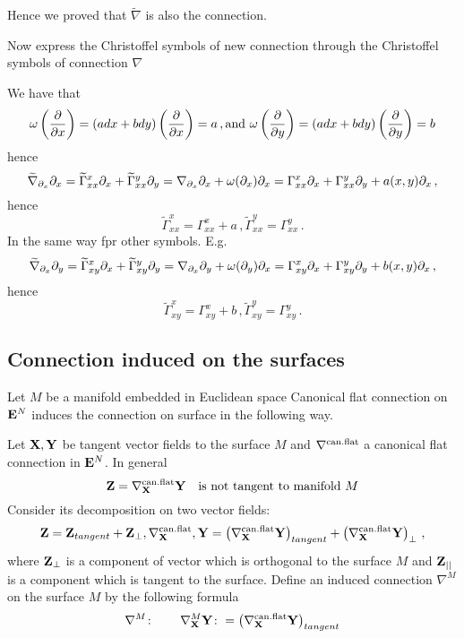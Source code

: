 \documentclass[12pt]{article}
\theoremstyle{theorem}
\numberwithin{equation}{section}
\begin{document}
		Hence we proved that
$\widetilde\nabla$ is also the connection.

Now express the Christoffel symbols of new connection
through the Christoffel symbols of connection $\nabla$

We have that
$$
\omega\left({\partial\over \partial x}\right)=
(adx+bdy)\left({\partial\over \partial x}\right)=a\,,
{\rm and}\,\,
\omega\left({\partial\over \partial y}\right)=
(adx+bdy)\left({\partial\over \partial y}\right)=b
$$
hence
            $$
\widetilde\nabla_{\partial_x}\partial_x=
\widetilde\Gamma^x_{xx}{\partial_x}
+\widetilde\Gamma^y_{xx}{\partial_y}=
\nabla_{\partial_x}\partial_x+\omega(\partial_x)\partial_x=
\Gamma^x_{xx}{\partial_x}
+\Gamma^y_{xx}{\partial_y}+a(x,y)\partial_x\,,
     $$
     hence
      $$
      \widetilde\Gamma^x_{xx}=
      \Gamma^x_{xx}+a\,,
      \widetilde\Gamma^y_{xx}=
      \Gamma^y_{xx}\,.
      $$
    In the same way fpr other symbols.  E.g. 
       $$
\widetilde\nabla_{\partial_x}\partial_y=
\widetilde\Gamma^x_{xy}{\partial_x}
+\widetilde\Gamma^y_{xy}{\partial_y}=
\nabla_{\partial_x}\partial_y+\omega(\partial_y)\partial_x=
\Gamma^x_{xy}{\partial_x}
+\Gamma^y_{xy}{\partial_y}+b(x,y)\partial_x\,,
     $$
     hence
      $$
      \widetilde\Gamma^x_{xy}=
      \Gamma^x_{xy}+b\,,
      \widetilde\Gamma^y_{xy}=
      \Gamma^y_{xy}\,.
      $$
             



	 \subsection {Connection induced on the surfaces}

   Let $M$ be a manifold embedded in 
 Euclidean space%
    Canonical flat connection on ${\bf E}^N$  induces the 
connection on surface in the following way.

    Let ${\bf X},{\bf Y}$ be tangent vector fields to the surface $M$ and $\nabla^{\rm can.flat}$ a canonical flat
    connection in ${\bf E}^N$.
    In general
            \begin{equation}\label{nottangent!}
                {\bf Z}=    \nabla^{\rm can.flat}_{\bf X}{\bf Y}\quad \hbox{is not tangent to manifold $M$}
                \end{equation}
                Consider its decomposition on two vector fields:
                          \begin{equation}\label{nottangent!2}
             {\bf Z}={\bf Z}_{tangent}+{\bf Z}_\bot,       \nabla^{\rm can.flat}_{\bf X},{\bf Y}=
                    \left(\nabla^{\rm can.flat}_{\bf X}{\bf Y}\right)_{tangent}+
                    \left(\nabla^{\rm can.flat}_{\bf X}{\bf Y}\right)_{\bot}\,,
                \end{equation}
where ${\bf Z}_{\bot}$ is a component of vector which is orthogonal to the surface $M$ and ${\bf Z}_{||}$ is a component which
is tangent to the surface. Define an induced connection $\nabla^{M}$ on the surface $M$ by the following formula
\begin{equation}\label{inducedconnection1}
\nabla^{M}\colon\qquad \nabla^{M}_{\bf X}{\bf Y} \colon =
\left(\nabla^{\rm can.flat}_{\bf X}{\bf Y}\right)_{tangent}
\end{equation}
\end{document}
